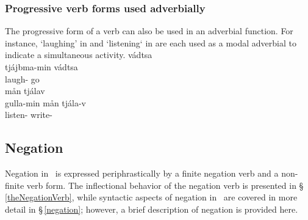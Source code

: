 \subsubsection{Progressive verb forms used adverbially}\label{ADVverbs}
The progressive form of a verb can also be used in an adverbial function. For instance,  ‘laughing’ in  and  ‘listening‘ in  are each used as a modal adverbial to indicate a simultaneous activity. 
\ea\label{ADVverbsEx1}%
\glll	{} vádtsa\\
	tjájbma-min vádtsa\\
	laugh- go\BS{}\\\nopagebreak
{}	
\z
\ea\label{ADVverbsEx2}%
\glll	{} mån tjálav\\
	gulla-min mån tjála-v\\
	listen-  write-\\\nopagebreak
{}	
\z



\subsection{Negation}\label{negationVerb}
Negation in \PS\ is expressed periphrastically by a finite negation verb and a non-finite verb form. The inflectional behavior of the negation verb is presented in §\,\ref{theNegationVerb}, while syntactic aspects of negation in \PS\ are covered in more detail in §\,\ref{negation}; however, a brief description of negation is provided here. 

